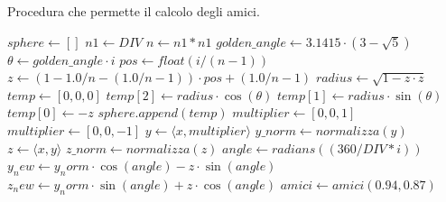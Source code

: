 \begin{algorithm}
	\caption{Procedura che permette il calcolo degli amici.}
	\label{alg:calcoloamici}
	\begin{algorithmic}
		\State $sphere \gets []$
		\State $n1 \gets DIV$
		\State $n \gets n1 * n1$
		\State $golden\_angle \gets 3.1415 \cdot (3 - \sqrt{5})$
		\State $\theta \gets golden\_angle \cdot i$
		\State $pos \gets float(i / (n-1))$
		\State $z \gets (1-1.0/n-(1.0/n-1))\cdot pos+(1.0/n-1)$
		\State $radius \gets \sqrt{1 - z \cdot z}$
		\State $temp \gets [0, 0, 0]$
		\State $temp[2] \gets radius \cdot \cos(\theta)$
		\State $temp[1] \gets radius \cdot \sin(\theta)$
		\State $temp[0] \gets -z$
		\State $sphere.append(temp)$
		\EndFor
		\State $multiplier \gets [0, 0, 1]$
		\State $multiplier \gets [0, 0, -1]$
		\EndIf
		\State $y \gets \langle x,multiplier \rangle$
		\State $y\_norm \gets normalizza(y)$
		\State $z \gets \langle x,y \rangle$
		\State $z\_norm \gets normalizza(z)$
		\State $angle \gets radians((360/DIV*i))$
		\State $y_new \gets y_norm\cdot\cos(angle) - z\cdot\sin(angle)$
		\State $z_new \gets y_norm\cdot\sin(angle) + z\cdot\cos(angle)$
		\EndFor
		\EndFor
		\State $amici \gets amici(0.94, 0.87)$ 
		\EndProcedure
	\end{algorithmic}
\end{algorithm}

